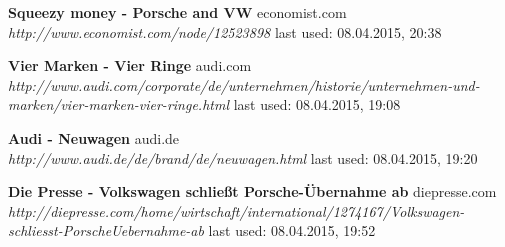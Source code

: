 \documentclass[12pt]{article}
\begin{document}
\begin{thebibliography}{56}
\textbf{Squeezy money - Porsche and VW} economist.com \\
\textit{http://www.economist.com/node/12523898}
\newline last used: 08.04.2015, 20:38

\textbf{Vier Marken - Vier Ringe} audi.com \\
\textit{http://www.audi.com/corporate/de/unternehmen/historie/unternehmen-und-marken/vier-marken-vier-ringe.html}
\newline last used: 08.04.2015, 19:08

\textbf{Audi - Neuwagen} audi.de \\
\textit{http://www.audi.de/de/brand/de/neuwagen.html}
\newline last used: 08.04.2015, 19:20

\textbf{Die Presse - Volkswagen schließt Porsche-Übernahme ab} diepresse.com \\
\textit{http://diepresse.com/home/wirtschaft/international/1274167/Volkswagen-schliesst-PorscheUebernahme-ab}
\newline last used: 08.04.2015, 19:52




\end{thebibliography}
\end{document}
